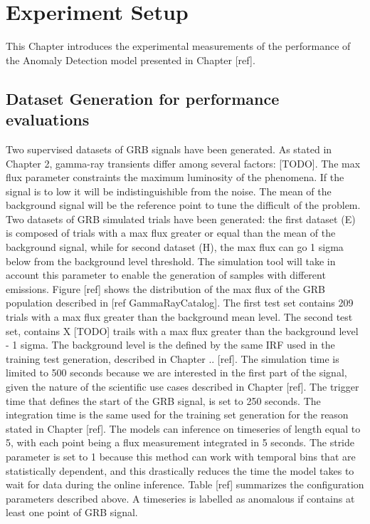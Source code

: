 \section{Experiment Setup}
\label{s:Experiment-Setup}

This Chapter introduces the experimental measurements of the performance of the Anomaly Detection model presented in Chapter [ref].

\subsection{Dataset Generation for performance evaluations}
\label{s:Experiment-Data}
Two supervised datasets of GRB signals have been generated. As stated in Chapter 2, gamma-ray transients differ among several factors: [TODO]. The max flux parameter constraints the maximum luminosity of the phenomena. If the signal is to low it will be indistinguishible from the noise. The mean of the background signal will be the reference point to tune the difficult of the problem. Two datasets of GRB simulated trials have been generated: the first dataset (E) is composed of trials with a max flux greater or equal than the mean of the background signal, while for second dataset (H), the max flux can go 1 sigma below from the background level threshold. The simulation tool will take in account this parameter to enable the generation of samples with different emissions. Figure [ref] shows the distribution of the max flux of the GRB population described in [ref GammaRayCatalog]. The first test set contains 209 trials with a max flux greater than the background mean level. The second test set, contains X [TODO] trails with a max flux greater than the background level - 1 sigma. The background level is the defined by the same IRF used in the training test generation, described in Chapter .. [ref]. The simulation time is limited to 500 seconds because we are interested in the first part of the signal, given the nature of the scientific use cases described in Chapter [ref]. The trigger time that defines the start of the GRB signal, is set to 250 seconds. The integration time is the same used for the training set generation for the reason stated in Chapter [ref]. The models can inference on timeseries of length equal to 5, with each point being a flux measurement integrated in 5 seconds. The stride parameter is set to 1 because this method can work with temporal bins that are statistically dependent, and this drastically reduces the time the model takes to wait for data during the online inference. Table [ref] summarizes the configuration parameters described above.  
A timeseries is labelled as anomalous if contains at least one point of GRB signal.

